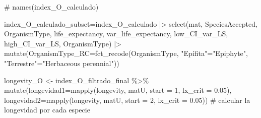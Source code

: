 \documentclass[
  12pt,
  letterpaper,
]{book}
\newenvironment{Shaded}{\begin{snugshade}}{\end{snugshade}}
\newcommand{\AttributeTok}[1]{\textcolor[rgb]{0.40,0.45,0.13}{#1}}
\newcommand{\CommentTok}[1]{\textcolor[rgb]{0.37,0.37,0.37}{#1}}
\newcommand{\DecValTok}[1]{\textcolor[rgb]{0.68,0.00,0.00}{#1}}
\newcommand{\FloatTok}[1]{\textcolor[rgb]{0.68,0.00,0.00}{#1}}
\newcommand{\FunctionTok}[1]{\textcolor[rgb]{0.28,0.35,0.67}{#1}}
\newcommand{\NormalTok}[1]{\textcolor[rgb]{0.00,0.23,0.31}{#1}}
\newcommand{\OtherTok}[1]{\textcolor[rgb]{0.00,0.23,0.31}{#1}}
\newcommand{\SpecialCharTok}[1]{\textcolor[rgb]{0.37,0.37,0.37}{#1}}
\newcommand{\StringTok}[1]{\textcolor[rgb]{0.13,0.47,0.30}{#1}}
\begin{document}
\begin{Shaded}
\begin{Highlighting}[]
\CommentTok{\# names(index\_O\_calculado)}

\NormalTok{index\_O\_calculado\_subset}\OtherTok{=}\NormalTok{index\_O\_calculado }\SpecialCharTok{|\textgreater{}} 
  \FunctionTok{select}\NormalTok{(mat, SpeciesAccepted, OrganismType, life\_expectancy, var\_life\_expectancy, }
\NormalTok{         low\_CI\_var\_LS, high\_CI\_var\_LS, OrganismType) }\SpecialCharTok{|\textgreater{}} 
  \FunctionTok{mutate}\NormalTok{(}\AttributeTok{OrganismType\_RC=}\FunctionTok{fct\_recode}\NormalTok{(OrganismType,}
                             \StringTok{"Epífita"}\OtherTok{=}\StringTok{"Epiphyte"}\NormalTok{,}
                             \StringTok{"Terrestre"}\OtherTok{=}\StringTok{"Herbaceous perennial"}\NormalTok{))}


\NormalTok{longevity\_O }\OtherTok{\textless{}{-}}\NormalTok{ index\_O\_filtrado\_final }\SpecialCharTok{\%\textgreater{}\%}
  \FunctionTok{mutate}\NormalTok{(}\AttributeTok{longevidad1=}\FunctionTok{mapply}\NormalTok{(longevity, matU, }\AttributeTok{start =} \DecValTok{1}\NormalTok{, }\AttributeTok{lx\_crit =} \FloatTok{0.05}\NormalTok{),}
         \AttributeTok{longevidad2=}\FunctionTok{mapply}\NormalTok{(longevity, matU, }\AttributeTok{start =} \DecValTok{2}\NormalTok{, }\AttributeTok{lx\_crit =} \FloatTok{0.05}\NormalTok{)) }\CommentTok{\# calcular la longevidad por cada especie}
\end{Highlighting}
\end{Shaded}
\end{document}
